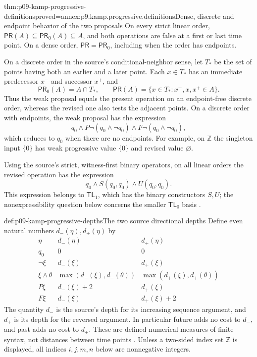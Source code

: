 \begin{hblemma}{thm:p09-kamp-progressive-definitions}{proved=annex:p9.kamp.progressive.definitions}{Dense, discrete and endpoint behavior of the two proposals}
On every strict linear order,
\(\mathsf{PR}(A)\subseteq\mathsf{PR}_0(A)\subseteq A\),
and both operations are false at a first or last time point.
On a dense order, \(\mathsf{PR}=\mathsf{PR}_0\), including
when the order has endpoints.

On a discrete order in the source's conditional-neighbor sense,
let \(T_*\) be the set of points having both an earlier and a
later point. Each \(x\in T_*\) has an immediate predecessor
\(x^-\) and successor \(x^+\), and
\[
 \mathsf{PR}_0(A)=A\cap T_*,\qquad
 \mathsf{PR}(A)=\{x\in T_*:x^-,x,x^+\in A\}.
\]
Thus the weak proposal equals the present operation on an endpoint-free
discrete order, whereas the revised one also tests the adjacent points.
On a discrete order with endpoints, the weak proposal has the expression
\[
 q_0\land P\neg(q_0\land\neg q_0)
       \land F\neg(q_0\land\neg q_0),
\]
which reduces to \(q_0\) when there are no endpoints.
For example, on \(\mathbb Z\) the singleton input \(\{0\}\)
has weak progressive value \(\{0\}\) and revised value
\(\varnothing\).

Using the source's strict, witness-first binary operators, on all
linear orders the revised operation has the expression
\[
                         q_0\land S(q_0,q_0)\land U(q_0,q_0).
\]
This expression belongs to \(\mathsf{TL}_1\), which has the
binary constructors \(S,U\); the nonexpressibility question below
concerns the smaller \(\mathsf{TL}_0\) basis
\cite[pp.~112--113]{Kamp1968}.
\end{hblemma}

\begin{hbdefinition}{def:p09-kamp-progressive-depths}{The two source directional depths}
Define even natural numbers \(d_-(\eta),d_+(\eta)\) by
\[
\begin{array}{c|cc}
 \eta&d_-(\eta)&d_+(\eta)\\ \hline
 q_0&0&0\\
 \neg\xi&d_-(\xi)&d_+(\xi)\\
 \xi\land\theta&\max(d_-(\xi),d_-(\theta))
                    &\max(d_+(\xi),d_+(\theta))\\
 P\xi&d_-(\xi)+2&d_+(\xi)\\
 F\xi&d_-(\xi)&d_+(\xi)+2
\end{array}
\]
The quantity \(d_-\) is the source's depth for its increasing
sequence argument, and \(d_+\) is its depth for the reversed
argument. In particular future adds no cost to \(d_-\), and
past adds no cost to \(d_+\). These are defined numerical
measures of finite syntax, not distances between time points
\cite[pp.~114--117]{Kamp1968}.
Unless a two-sided index set \(\mathbb Z\) is displayed,
all indices \(i,j,m,n\) below are nonnegative integers.
\end{hbdefinition}

